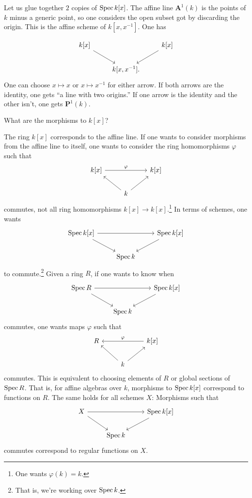 \documentclass [11 pt, oneside, margin = 1 in] {article}
\begin{document}
\begin{example}[ ]\label{gluing_1}\text{}
Let us glue together $2$ copies of $\operatorname{Spec} k[x]$. The affine line $\mathbf{A}^1(k)$ is the points of $k$ minus a generic point, so one considers the open subset got by discarding the origin. This is the affine scheme of $k[x,x^{-1}]$. One has

\[
\begin{tikzcd}
	k[x]\ar[dr] && k[x] \ar[dl]\\
		    &k[x,x^{-1}].
\end{tikzcd}
\]
One can choose $x\longmapsto x$ or $x\longmapsto x^{-1}$ for either arrow. If both arrows are the identity, one gets ``a line with two origins.'' If one arrow is the identity and the other isn't, one gets $\mathbf{P}^1(k)$.
\end{example}

\begin{problem}
	What are the morphisms to $k[x]$?
\end{problem}

The ring $k[x]$ corresponds to the affine line. If one wants to consider morphisms from the affine line to itself, one wants to consider the ring homomorphisms $\varphi$ such that
\[
\begin{tikzcd}
	k[x] \ar[rr, "\varphi"] &&k[x] \\
			       &k\ar[lu] \ar[ru]
\end{tikzcd}
\]
commutes, not all ring homomorphisms $k[x] \longrightarrow k[x]$.\footnote{One wants $\varphi(k)=k$.} In terms of schemes, one wants
\[
\begin{tikzcd}
	\Spec k[x] \ar[dr] \ar[rr] &&\Spec k[x] \ar[dl]\\
				   &\Spec k
\end{tikzcd}
\]
to commute.\footnote{That is, we're working over $\operatorname{Spec} k$.} Given a ring $R$, if one wants to know when
\[
\begin{tikzcd}
\Spec R \ar[dr] \ar[rr] &&\Spec k[x] \ar[dl]\\
                                   &\Spec k	
\end{tikzcd}
\]
commutes, one wants maps $\varphi$ such that
\[
\begin{tikzcd}
	R && k[x] \ar[ll,  "\varphi",  swap] \\
	  &k \ar[ul]\ar[ur]
\end{tikzcd}
\]
commutes. This is equivalent to choosing elements of $R$ or global sections of $\operatorname{Spec} R$. That is, for affine algebras over $k$, morphisms to $\operatorname{Spec} k[x]$ correspond to functions on $R$. The same holds for all schemes $X$: Morphisms such that
\[
\begin{tikzcd}
	X \ar[dr] \ar[rr] &&\Spec k[x] \ar[dl]\\
                                   &\Spec k    
\end{tikzcd}
\]
commutes correspond to regular functions on $X$.
\end{document}
